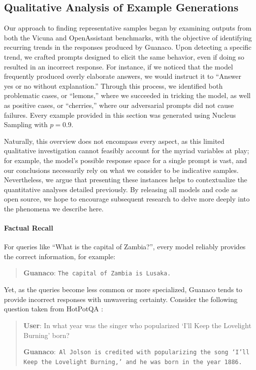 \subsection{Qualitative Analysis of Example Generations}
\label{ssec:examples}

Our approach to finding representative samples began by examining outputs from both the Vicuna and OpenAssistant benchmarks, with the objective of identifying recurring trends in the responses produced by {Guanaco}. Upon detecting a specific trend, we crafted prompts designed to elicit the same behavior, even if doing so resulted in an incorrect response. For instance, if we noticed that the model frequently produced overly elaborate answers, we would instruct it to ``Answer yes or no without explanation.'' Through this process, we identified both problematic cases, or ``lemons,'' where we succeeded in tricking the model, as well as positive cases, or ``cherries,'' where our adversarial prompts did not cause failures. Every example provided in this section was generated using Nucleus Sampling \cite{holtzmancurious} with $p=0.9$.

Naturally, this overview does not encompass every aspect, as this limited qualitative investigation cannot feasibly account for the myriad variables at play; for example, the model’s possible response space for a single prompt is vast, and our conclusions necessarily rely on what we consider to be indicative samples. Nevertheless, we argue that presenting these instances helps to contextualize the quantitative analyses detailed previously. By releasing all models and code as open source, we hope to encourage subsequent research to delve more deeply into the phenomena we describe here.
\paragraph{Factual Recall} For queries like ``What is the capital of Zambia?'', every model reliably provides the correct information, for example:

\begin{quote} 
    \textbf{Guanaco}:
    \texttt{The capital of Zambia is Lusaka.}
\end{quote}

Yet, as the queries become less common or more specialized, {Guanaco} tends to provide incorrect responses with unwavering certainty. Consider the following question taken from HotPotQA \citep{yang2018hotpotqa}:

\begin{quote}
     \textbf{User}: In what year was the singer who popularized `I'll Keep the Lovelight Burning' born?  

     \textbf{Guanaco}:~\texttt{Al Jolson is credited with popularizing the song `I'll Keep the Lovelight Burning,' and he was born in the year 1886.}
 \end{quote}

